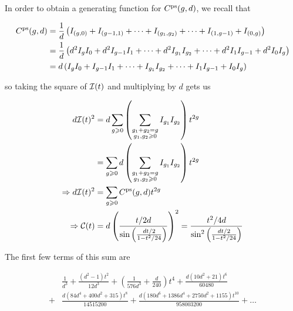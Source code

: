 \documentclass[12pt]{memoir}
\begin{document}
In order to obtain a generating function for \(C^{\operatorname{\mathrm{ps}}}(g,d)\), we recall that

\begin{align*}
    C^{\operatorname{\mathrm{ps}}}(g,d) & =\frac{1}{d}\left(I_{(g,0)}+I_{(g-1,1)}+\dots+I_{(g_1,g_2)}+\dots+I_{(1,g-1)}+I_{(0,g)}\right)           \\
                 & =\frac{1}{d}\left(d^2I_gI_0+d^2I_{g-1}I_1+\dots+{d^2}I_{g_1}I_{g_2}+\dots+d^2I_1I_{g-1}+d^2I_0I_g\right) \\
                 & =d\left(I_gI_0+I_{g-1}I_1+\dots+I_{g_1}I_{g_2}+\dots+I_1I_{g-1}+I_0I_g\right)
\end{align*}

so taking the square of \(\mathcal{I}(t)\) and multiplying by \(d\) gets us

\begin{align*}
    d\mathcal{I}(t)^2     & =d\sum_{g\geqslant 0} \left(\sum_{\substack{g_1+g_2=g                                                                             \\ g_1,g_2\geqslant 0}}I_{g_1}I_{g_2}\right)t^{2g}\\
                  & =\sum_{g\geqslant 0} d\left(\sum_{\substack{g_1+g_2=g                                                                             \\ g_1,g_2\geqslant 0}}I_{g_1}I_{g_2}\right)t^{2g}\\
    \Rightarrow d\mathcal{I}(t)^2 & =\sum_{g\geqslant 0} C^{\operatorname{\mathrm{ps}}}(g,d)t^{2g}                                                                                           \\
    \Rightarrow\mathcal{C}(t)     & =d\left(\frac{t/2d}{\sin\left(\frac{dt/2}{1-t^2/24}\right)}\right)^2=\frac{t^2/4d}{\sin^2\left(\frac{dt/2}{1-t^2/24}\right)} \\
\end{align*}

The first few terms of this sum are

\begin{align*}
      & \frac{1}{d^{3}} + \frac{(d^{2} - 1) t^{2}}{12 d^{3}} + \left(\frac{1}{576 d^{3}} + \frac{d}{240}\right) t^{4} + \frac{d (10 d^{2} + 21) t^{6}}{60480} \\
    + & \frac{d (84 d^{4} + 400 d^{2} + 315) t^{8}}{14515200} + \frac{d (180 d^{6} + 1386 d^{4} + 2750 d^{2} + 1155) t^{10}}{958003200}+\dots
\end{align*}
\end{document}
